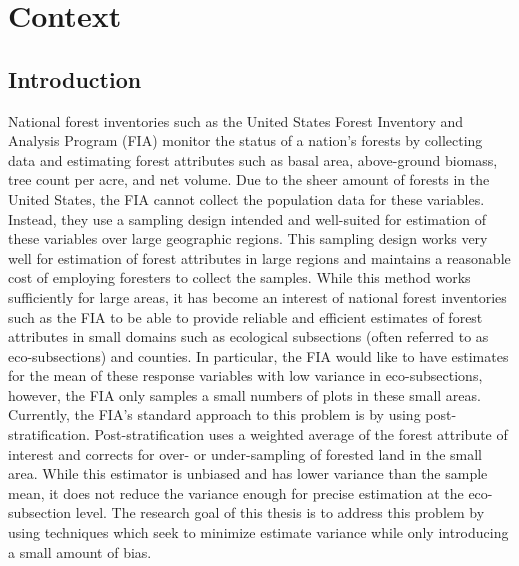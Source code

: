\documentclass[12pt,twoside]{reedthesis}
\begin{document}
\hypertarget{context}{%
\chapter{Context}\label{context}}

\hypertarget{introduction}{%
\section{Introduction}\label{introduction}}

National forest inventories such as the United States Forest Inventory and Analysis Program (FIA) monitor the status of a nation's forests by collecting data and estimating forest attributes such as basal area, above-ground biomass, tree count per acre, and net volume. Due to the sheer amount of forests in the United States, the FIA cannot collect the population data for these variables. Instead, they use a sampling design intended and well-suited for estimation of these variables over large geographic regions. This sampling design works very well for estimation of forest attributes in large regions and maintains a reasonable cost of employing foresters to collect the samples. While this method works sufficiently for large areas, it has become an interest of national forest inventories such as the FIA to be able to provide reliable and efficient estimates of forest attributes in small domains such as ecological subsections (often referred to as eco-subsections) and counties. In particular, the FIA would like to have estimates for the mean of these response variables with low variance in eco-subsections, however, the FIA only samples a small numbers of plots in these small areas. Currently, the FIA's standard approach to this problem is by using post-stratification. Post-stratification uses a weighted average of the forest attribute of interest and corrects for over- or under-sampling of forested land in the small area. While this estimator is unbiased and has lower variance than the sample mean, it does not reduce the variance enough for precise estimation at the eco-subsection level. The research goal of this thesis is to address this problem by using techniques which seek to minimize estimate variance while only introducing a small amount of bias.
\end{document}
